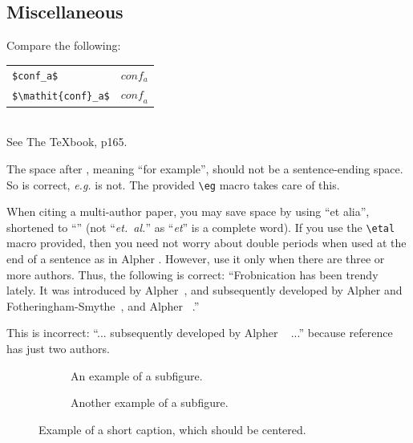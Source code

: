 \documentclass[10pt,twocolumn,letterpaper]{article}
\begin{document}
\subsection{Miscellaneous}

\noindent
Compare the following:\\
\begin{tabular}{ll}
 \verb'$conf_a$' &  $conf_a$ \\
 \verb'$\mathit{conf}_a$' & $\mathit{conf}_a$
\end{tabular}\\
See The \TeX book, p165.

The space after \eg, meaning ``for example'', should not be a sentence-ending space.
So \eg is correct, {\em e.g.} is not.
The provided \verb'\eg' macro takes care of this.

When citing a multi-author paper, you may save space by using ``et alia'', shortened to ``\etal'' (not ``{\em et.\ al.}'' as ``{\em et}'' is a complete word).
If you use the \verb'\etal' macro provided, then you need not worry about double periods when used at the end of a sentence as in Alpher \etal.
However, use it only when there are three or more authors.
Thus, the following is correct:
   ``Frobnication has been trendy lately.
   It was introduced by Alpher~\cite{Alpher02}, and subsequently developed by
   Alpher and Fotheringham-Smythe~\cite{Alpher03}, and Alpher \etal~\cite{Alpher04}.''

This is incorrect: ``... subsequently developed by Alpher \etal~\cite{Alpher03} ...'' because reference~\cite{Alpher03} has just two authors.




\begin{figure}
  \centering
  \begin{subfigure}{0.68\linewidth}
    \fbox{\rule{0pt}{2in} \rule{.9\linewidth}{0pt}}
    \caption{An example of a subfigure.}
    \label{fig:short-a}
  \end{subfigure}
  \hfill
  \begin{subfigure}{0.28\linewidth}
    \fbox{\rule{0pt}{2in} \rule{.9\linewidth}{0pt}}
    \caption{Another example of a subfigure.}
    \label{fig:short-b}
  \end{subfigure}
  \caption{Example of a short caption, which should be centered.}
  \label{fig:short}
\end{figure}
\end{document}
